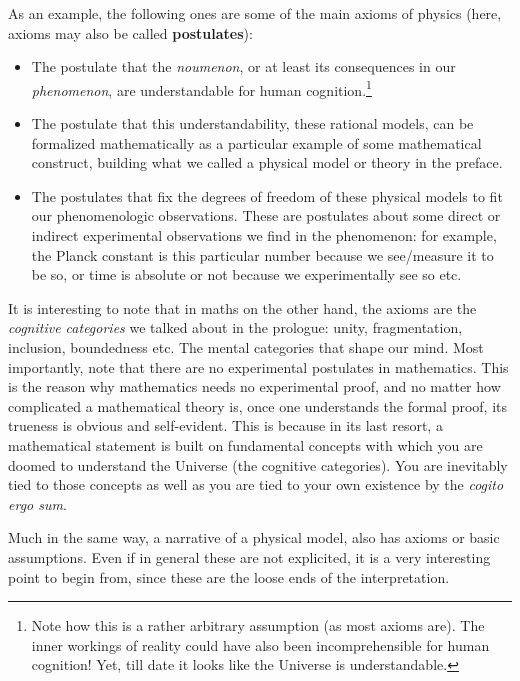 \documentclass[11pt, a4paper]{article} %
\DeclareRobustCommand{\mybox}[2][gray!10]{%
\begin{tcolorbox}[   %
        left=0.2cm,
        right=0.2cm,
        top=0.15cm,
        bottom=0.15cm,
        colback=#1,
        colframe=#1,
        width=\dimexpr\textwidth\relax, 
        enlarge left by=0mm,
        boxsep=5pt,
        arc=0pt,outer arc=0pt,
        ]
        #2
\end{tcolorbox}
}
\begin{document}
\mybox{As an example, the following ones are some of the main axioms of physics (here, axioms may also be called {\bf postulates}):\vspace{-0.1cm}
\begin{itemize}
\item The postulate that the {\em noumenon}, or at least its consequences in our {\em phenomenon}, are understandable for human cognition.\footnote{Note how this is a rather arbitrary assumption (as most axioms are). The inner workings of reality could have also been incomprehensible for human cognition! Yet, till date it looks like the Universe is understandable. } 

\item The postulate that this understandability, these rational models, can be formalized mathematically as a particular example of some mathematical construct, building what we called a physical model or theory in the preface.

\item The postulates that fix the degrees of freedom of these physical models to fit our phenomenologic observations. These are postulates about some direct or indirect experimental observations we find in the phenomenon: for example, the Planck constant is this particular number because we see/measure it to be so, or time is absolute or not because we experimentally see so etc.\vspace{-0.1cm}
\end{itemize}

It is interesting to note that in maths on the other hand, the axioms are the {\em cognitive categories} we talked about in the prologue: unity, fragmentation, inclusion, boundedness etc. The mental categories that shape our mind. Most importantly, note that there are no experimental postulates in mathematics. This is the reason why mathematics needs no experimental proof, and no matter how complicated a mathematical theory is, once one understands the formal proof, its trueness is obvious and self-evident. This is because in its last resort, a mathematical statement is built on fundamental concepts with which you are doomed to understand the Universe (the cognitive categories). You are inevitably tied to those concepts as well as you are tied to your own existence by the {\em cogito ergo sum}.}

Much in the same way, a narrative of a physical model, also has axioms or basic assumptions. Even if in general these are not explicited, it is a very interesting point to begin from, since these are the loose ends of the interpretation. 
\end{document}

